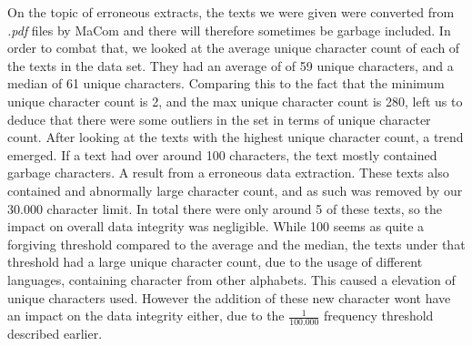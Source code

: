 On the topic of erroneous extracts, the texts we were given were converted from
\textit{.pdf} files by MaCom and there will therefore sometimes be garbage
included. In order to combat that, we looked at the average unique character
count of each of the texts in the data set. They had an average of of 59 unique
characters, and a median of 61 unique characters. Comparing this to the fact
that the minimum unique character count is 2, and the max unique character count
is 280, left us to deduce that there were some outliers in the set in terms of
unique character count. After looking at the texts with the highest unique
character count, a trend emerged. If a text had over around 100 characters,
the text mostly contained garbage characters. A result from a erroneous data
extraction. These texts also contained and abnormally large character count,
and as such was removed by our 30.000 character limit. In total there were only
around 5 of these texts, so the impact on overall data integrity was negligible.
While 100 seems as quite a forgiving threshold compared to the average and the
median, the texts under that threshold had a large unique character count, due
to the usage of different languages, containing character from other alphabets.
This caused a elevation of unique characters used. However the addition of these
new character wont have an impact on the data integrity either, due to the
$\frac{1}{100.000}$ frequency threshold described earlier.


